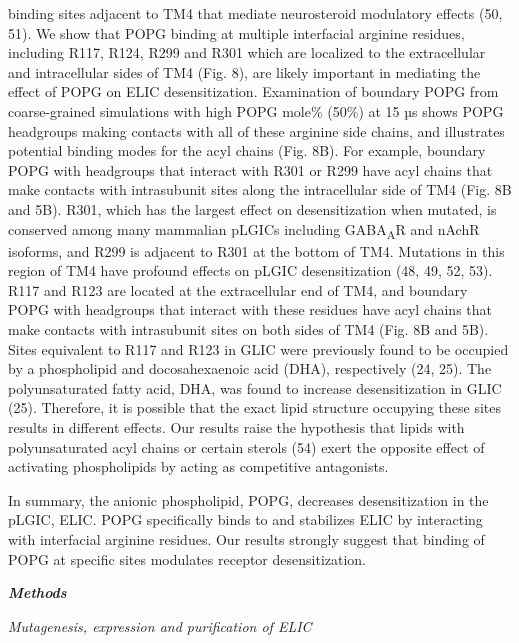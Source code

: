 binding sites adjacent to TM4 that mediate neurosteroid modulatory
effects (50, 51). We show that POPG binding at multiple interfacial
arginine residues, including R117, R124, R299 and R301 which are
localized to the extracellular and intracellular sides of TM4 (Fig. 8),
are likely important in mediating the effect of POPG on ELIC
desensitization. Examination of boundary POPG from coarse-grained
simulations with high POPG mole\% (50\%) at 15 µs shows POPG headgroups
making contacts with all of these arginine side chains, and illustrates
potential binding modes for the acyl chains (Fig. 8B). For example,
boundary POPG with headgroups that interact with R301 or R299 have acyl
chains that make contacts with intrasubunit sites along the
intracellular side of TM4 (Fig. 8B and 5B). R301, which has the largest
effect on desensitization when mutated, is conserved among many
mammalian pLGICs including GABA\textsubscript{A}R and nAchR isoforms,
and R299 is adjacent to R301 at the bottom of TM4. Mutations in this
region of TM4 have profound effects on pLGIC desensitization (48, 49,
52, 53). R117 and R123 are located at the extracellular end of TM4, and
boundary POPG with headgroups that interact with these residues have
acyl chains that make contacts with intrasubunit sites on both sides of
TM4 (Fig. 8B and 5B). Sites equivalent to R117 and R123 in GLIC were
previously found to be occupied by a phospholipid and docosahexaenoic
acid (DHA), respectively (24, 25). The polyunsaturated fatty acid, DHA,
was found to increase desensitization in GLIC (25). Therefore, it is
possible that the exact lipid structure occupying these sites results in
different effects. Our results raise the hypothesis that lipids with
polyunsaturated acyl chains or certain sterols (54) exert the opposite
effect of activating phospholipids by acting as competitive antagonists.

In summary, the anionic phospholipid, POPG, decreases desensitization in
the pLGIC, ELIC. POPG specifically binds to and stabilizes ELIC by
interacting with interfacial arginine residues. Our results strongly
suggest that binding of POPG at specific sites modulates receptor
desensitization.

\textbf{\emph{Methods}}

\emph{Mutagenesis, expression and purification of ELIC}

